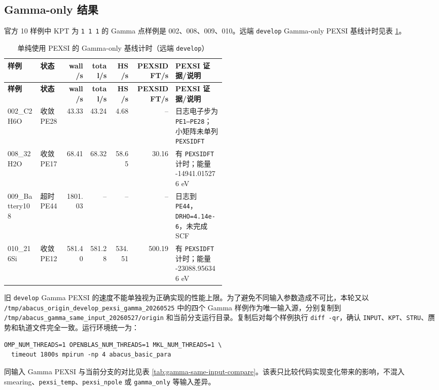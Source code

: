 \documentclass[a4paper,11pt]{article}
\newcommand{\code}[1]{\texttt{#1}}
\begin{document}
\subsection{Gamma-only 结果}

官方 10 样例中 KPT 为 \code{1 1 1} 的 Gamma 点样例是 002、008、009、010。远端 \code{develop} Gamma-only PEXSI 基线计时见表 \ref{tab:origin-develop-gamma-pexsi}。

{\scriptsize
\begin{longtable}{@{}p{0.15\linewidth}p{0.12\linewidth}r r r r p{0.23\linewidth}@{}}
\caption{单纯使用 PEXSI 的 Gamma-only 基线计时（远端 \code{develop}）}
\label{tab:origin-develop-gamma-pexsi}\\
\toprule
\textbf{样例} & \textbf{状态} & \textbf{wall/s} & \textbf{total/s} & \textbf{HS/s} & \textbf{PEXSIDFT/s} & \textbf{PEXSI 证据/说明}\\
\midrule
\endfirsthead
\toprule
\textbf{样例} & \textbf{状态} & \textbf{wall/s} & \textbf{total/s} & \textbf{HS/s} & \textbf{PEXSIDFT/s} & \textbf{PEXSI 证据/说明}\\
\midrule
\endhead
002\_C2H6O & 收敛 PE28 & 43.33 & 43.24 & 4.68 & -- & 日志电子步为 \code{PE1--PE28}；小矩阵未单列 \code{PEXSIDFT}\\
008\_32H2O & 收敛 PE17 & 68.41 & 68.32 & 58.65 & 30.16 & 有 \code{PEXSIDFT} 计时；能量 -14941.015276 eV\\
009\_Battery108 & 超时 PE44 & 1801.03 & -- & -- & -- & 日志到 \code{PE44}，\code{DRHO=4.14e-6}，未完成 SCF\\
010\_216Si & 收敛 PE12 & 581.40 & 581.28 & 534.51 & 500.19 & 有 \code{PEXSIDFT} 计时；能量 -23088.956346 eV\\
\bottomrule
\end{longtable}
}

旧 \code{develop} Gamma PEXSI 的速度不能单独视为正确实现的性能上限。为了避免不同输入参数造成不可比，本轮又以 \code{/tmp/abacus\_origin\_develop\_pexsi\_gamma\_20260525} 中的四个 Gamma 样例作为唯一输入源，分别复制到 \code{/tmp/abacus\_gamma\_same\_input\_20260527/origin} 和当前分支运行目录。复制后对每个样例执行 \code{diff -qr}，确认 \code{INPUT}、\code{KPT}、\code{STRU}、赝势和轨道文件完全一致。运行环境统一为：

\begin{verbatim}
OMP_NUM_THREADS=1 OPENBLAS_NUM_THREADS=1 MKL_NUM_THREADS=1 \
  timeout 1800s mpirun -np 4 abacus_basic_para
\end{verbatim}

同输入 Gamma PEXSI 与当前分支的对比见表 \ref{tab:gamma-same-input-compare}。该表只比较代码实现变化带来的影响，不混入 smearing、\code{pexsi\_temp}、\code{pexsi\_npole} 或 \code{gamma\_only} 等输入差异。
\end{document}
